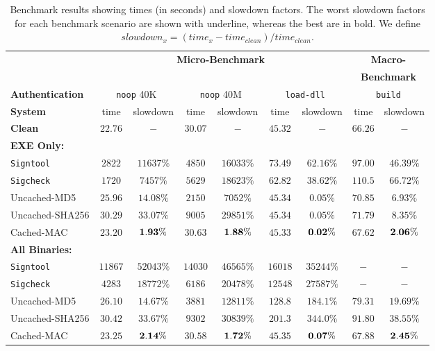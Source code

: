 \begin{sidewaystable*}
\centering
\begin{tabular}{|l||c|c||c|c||c|c||c|c|}
\hline
   & \multicolumn{6}{|c||}{{\bf Micro-Benchmark}} & \multicolumn{2}{|c|}{{\bf Macro-}} \\
   & \multicolumn{6}{|c||}{} & \multicolumn{2}{|c|}{{{\bf Benchmark}}} \\
{\bf Authentication}	& \multicolumn{2}{|c||}{{\tt noop} 40K} & \multicolumn{2}{|c||}{{\tt noop} 40M}
   & \multicolumn{2}{|c||}{{\tt load-dll}} & \multicolumn{2}{|c|}{{\tt build}} \\
{\bf System}    & time & slowdown & time & slowdown
                & time & slowdown & time & slowdown \\
\hline
\hline
{\bf Clean}     & $22.76$ & $-$ & $30.07$ & $-$
                & $45.32$ & $-$ & $66.26$ & $-$ \\
\hline
{\bf EXE Only:} & & & & & & & & \\
{\tt Signtool}  & $2822$ & \underline{$11637\%$} & $4850$ & $16033\%$
                & $73.49$ & \underline{$62.16\%$} & $97.00$ & $46.39\%$ \\
{\tt Sigcheck}  & $1720$ & $7457\%$ & $5629$ & $18623\%$
                & $62.82$ & $38.62\%$ & $110.5$ & \underline{$66.72\%$} \\
Uncached-MD5    & $25.96$ & $14.08\%$ & $2150$ & $7052\%$
                & $45.34$ & $0.05\%$ & $70.85$ & $6.93\%$ \\
Uncached-SHA256 & $30.29$ & $33.07\%$ & $9005$ & \underline{$29851\%$}
                & $45.34$ & $0.05\%$ & $71.79$ & $8.35\%$ \\
Cached-MAC      & $23.20$ & ${\bf 1.93}\%$ & $30.63$ & ${\bf 1.88}\%$
                & $45.33$ & ${\bf 0.02}\%$ & $67.62$ & ${\bf 2.06}\%$ \\
\hline
{\bf All Binaries:} & & & & & & & & \\
{\tt Signtool}  & $11867$ & \underline{$52043\%$} & $14030$ & \underline{$46565\%$}
                & $16018$ & \underline{$35244\%$} & $-$ & $-$ \\
{\tt Sigcheck}  & $4283$ & $18772\%$ & $6186$ & $20478\%$
                & $12548$ & $27587\%$ & $-$ & $-$ \\
Uncached-MD5    & $26.10$ & $14.67\%$ & $3881$ & $12811\%$
                & $128.8$ & $184.1\%$ & $79.31$ & $19.69\%$ \\
Uncached-SHA256 & $30.42$ & $33.67\%$ & $9302$ & $30839\%$
                & $201.3$ & $344.0\%$ & $91.80$ & \underline{$38.55\%$} \\
Cached-MAC      & $23.25$ & ${\bf 2.14\%}$ & $30.58$ & ${\bf 1.72\%}$
                & $45.35$ & ${\bf 0.07\%}$ & $67.88$ & ${\bf 2.45\%}$ \\
\hline
\end{tabular}
\caption{Benchmark results showing times (in seconds) and slowdown factors. The worst slowdown
factors for each benchmark scenario are shown with underline, whereas the best are in bold.
We define $slowdown_x = (time_x - time_{clean}) / time_{clean}$.}
\label{table:bigtable}
\end{sidewaystable*}


